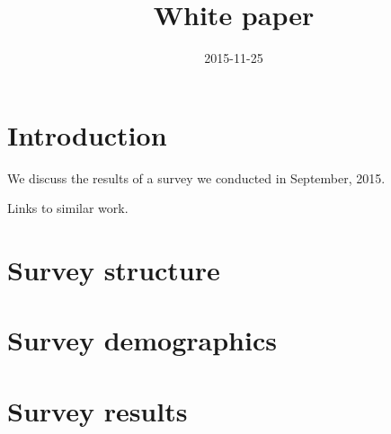 \documentclass{casicswhitepaper}
\begin{document}
\title{White paper}
\date{2015-11-25}
\maketitle

\section{Introduction}

We discuss the results of a survey we conducted in September, 2015. 

Links to similar work.

\section{Survey structure}

\section{Survey demographics}

\section{Survey results}
\end{document}
